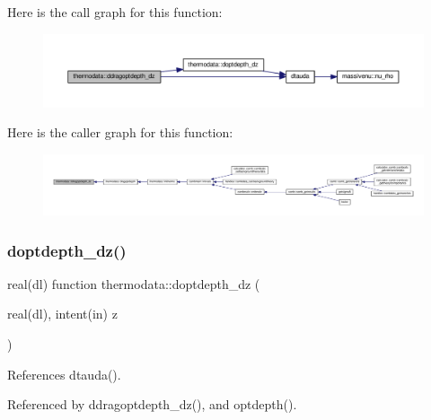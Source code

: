 Here is the call graph for this function\+:
\nopagebreak
\begin{figure}[H]
\begin{center}
\leavevmode
\includegraphics[width=350pt]{namespacethermodata_a3d2fe3077a350ae407ecb93f927b2cc4_cgraph}
\end{center}
\end{figure}
Here is the caller graph for this function\+:
\nopagebreak
\begin{figure}[H]
\begin{center}
\leavevmode
\includegraphics[width=350pt]{namespacethermodata_a3d2fe3077a350ae407ecb93f927b2cc4_icgraph}
\end{center}
\end{figure}
\mbox{\label{namespacethermodata_afdafed82de5a75a5b609d945a91836fa}} 
\subsubsection{\texorpdfstring{doptdepth\+\_\+dz()}{doptdepth\_dz()}}
{\footnotesize\ttfamily real(dl) function thermodata\+::doptdepth\+\_\+dz (\begin{DoxyParamCaption}\item[{real(dl), intent(in)}]{z }\end{DoxyParamCaption})\hspace{0.3cm}{\ttfamily [private]}}



References dtauda().



Referenced by ddragoptdepth\+\_\+dz(), and optdepth().

